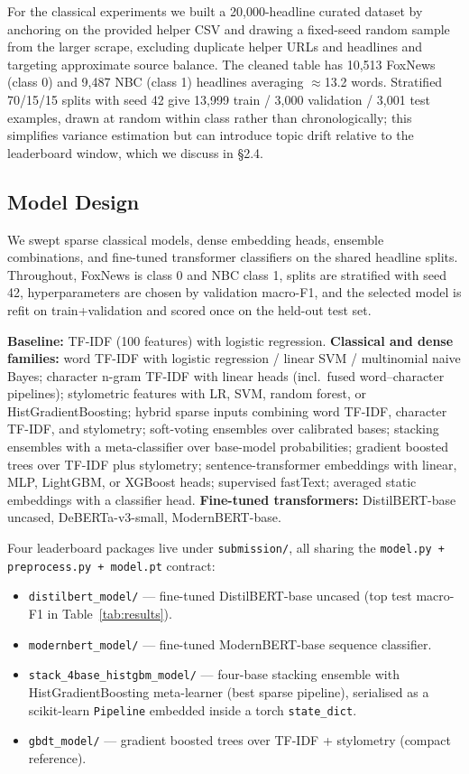 \documentclass[10pt]{article}
\begin{document}
For the classical experiments we built a 20{,}000-headline curated dataset by anchoring on the provided helper CSV and drawing a fixed-seed random sample from the larger scrape, excluding duplicate helper URLs and headlines and targeting approximate source balance. The cleaned table has 10{,}513 FoxNews (class 0) and 9{,}487 NBC (class 1) headlines averaging $\approx$13.2 words. Stratified 70/15/15 splits with seed 42 give 13{,}999 train / 3{,}000 validation / 3{,}001 test examples, drawn at random within class rather than chronologically; this simplifies variance estimation but can introduce topic drift relative to the leaderboard window, which we discuss in §2.4.

\subsection{Model Design}
We swept sparse classical models, dense embedding heads, ensemble combinations, and fine-tuned transformer classifiers on the shared headline splits. Throughout, FoxNews is class 0 and NBC class 1, splits are stratified with seed 42, hyperparameters are chosen by validation macro-F1, and the selected model is refit on train+validation and scored once on the held-out test set.

\textbf{Baseline:} TF-IDF (100 features) with logistic regression. \textbf{Classical and dense families:} word TF-IDF with logistic regression / linear SVM / multinomial naive Bayes; character n-gram TF-IDF with linear heads (incl.\ fused word--character pipelines); stylometric features with LR, SVM, random forest, or HistGradientBoosting; hybrid sparse inputs combining word TF-IDF, character TF-IDF, and stylometry; soft-voting ensembles over calibrated bases; stacking ensembles with a meta-classifier over base-model probabilities; gradient boosted trees over TF-IDF plus stylometry; sentence-transformer embeddings with linear, MLP, LightGBM, or XGBoost heads; supervised fastText; averaged static embeddings with a classifier head. \textbf{Fine-tuned transformers:} DistilBERT-base uncased, DeBERTa-v3-small, ModernBERT-base.

Four leaderboard packages live under \texttt{submission/}, all sharing the \texttt{model.py + preprocess.py + model.pt} contract:
\begin{itemize}
    \item \texttt{distilbert\_model/} --- fine-tuned DistilBERT-base uncased (top test macro-F1 in Table~\ref{tab:results}).
    \item \texttt{modernbert\_model/} --- fine-tuned ModernBERT-base sequence classifier.
    \item \texttt{stack\_4base\_histgbm\_model/} --- four-base stacking ensemble with HistGradientBoosting meta-learner (best sparse pipeline), serialised as a scikit-learn \texttt{Pipeline} embedded inside a torch \texttt{state\_dict}.
    \item \texttt{gbdt\_model/} --- gradient boosted trees over TF-IDF + stylometry (compact reference).
\end{itemize}
\end{document}
